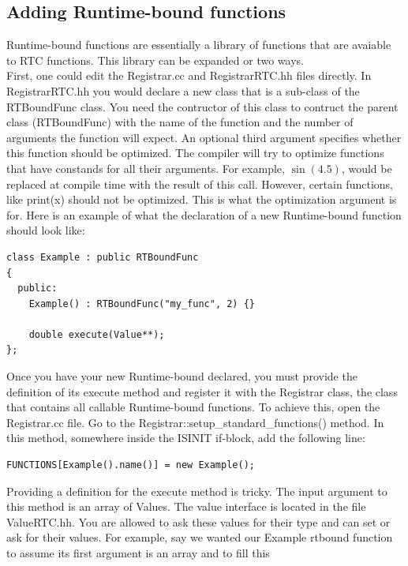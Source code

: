 \documentclass{article}
\begin{document}



\subsection{Adding Runtime-bound functions}

Runtime-bound functions are essentially a library of functions that are 
avaiable to RTC functions. This library can be expanded or two ways. \\

\noindent
First, one could edit the Registrar.cc and RegistrarRTC.hh files
directly. In RegistrarRTC.hh you would declare a new class that is a 
sub-class of the RTBoundFunc class. You need the contructor of this class
to contruct the parent class (RTBoundFunc) with the name of the function
and the number of arguments the function will expect. An optional third
argument specifies whether this function should be optimized. The compiler
will try to optimize functions that have constands for all their arguments.
For example, $\sin(4.5)$, would be replaced at compile time with the result 
of this call. However, certain functions, like print(x) should not be
optimized. This is what the optimization argument is for. Here is an example
of what the declaration of a new Runtime-bound function should look like:
{\ttfamily \begin{verbatim}
class Example : public RTBoundFunc
{
  public:
    Example() : RTBoundFunc("my_func", 2) {}
 
    double execute(Value**);
};
\end{verbatim} }
\noindent
Once you have your new Runtime-bound declared, you must provide the definition
of its execute method and register it with the Registrar class, the class that
contains all callable Runtime-bound functions. To achieve this, open the 
Registrar.cc file. Go to the Registrar::setup\_standard\_functions() method.
In this method, somewhere inside the ISINIT if-block, add the following
line:
{\ttfamily \begin{verbatim}
FUNCTIONS[Example().name()] = new Example();
\end{verbatim} }
\noindent
Providing a definition for the execute method is tricky. The input argument
to this method is an array of Values. The value interface is located in
the file ValueRTC.hh. You are allowed to ask these values for their type
and can set or ask for their values. For example, say we wanted our Example
rtbound function to assume its first argument is an array and to fill this
\end{document}
